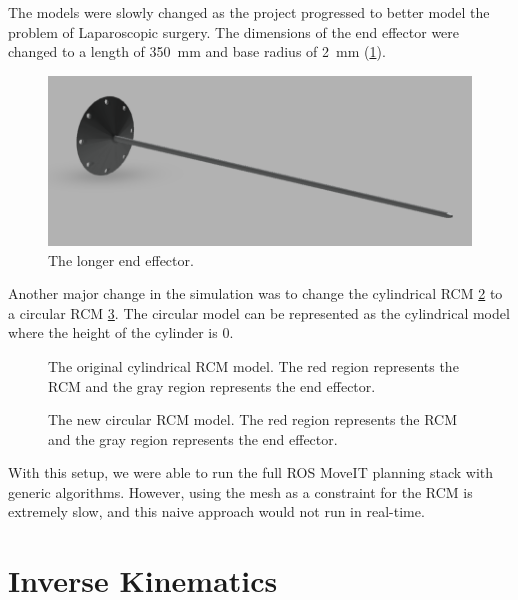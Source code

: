 \documentclass[BTech]{iitmdiss}
\begin{document}
    The models were slowly changed as the project progressed to better model the problem of Laparoscopic surgery.
    The dimensions of the end effector were changed to a length of \SI{350}{\milli\meter} and base radius of \SI{2}{\milli\meter} (\ref{fig:longer_ee}).

    \begin{figure}
        \centering
        \includegraphics[width=0.75 \linewidth]{./img/longer_end_effector}
        \caption{The longer end effector.}
        \label{fig:longer_ee}
    \end{figure}

    Another major change in the simulation was to change the cylindrical RCM \ref{fig:rcm_cylinder} to a circular RCM \ref{fig:rcm_circle}.
    The circular model can be represented as the cylindrical model where the height of the cylinder is 0.

    \begin{figure}
        \centering
        
        \caption{The original cylindrical RCM model. The red region represents the RCM and the gray region represents the end effector.}
        \label{fig:rcm_cylinder}
    \end{figure}

    \begin{figure}
        \centering
        
        \caption{The new circular RCM model. The red region represents the RCM and the gray region represents the end effector.}
        \label{fig:rcm_circle}
    \end{figure}

    With this setup, we were able to run the full ROS MoveIT planning stack with generic algorithms.
    However, using the mesh as a constraint for the RCM is extremely slow, and this naive approach would not run in real-time.


    \section{Inverse Kinematics}
\end{document}

